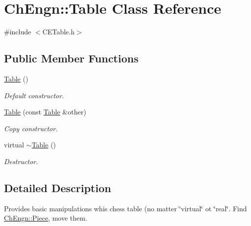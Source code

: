 \hypertarget{classChEngn_1_1Table}{
\section{ChEngn::Table Class Reference}
\label{classChEngn_1_1Table}
}


{\ttfamily \#include $<$CETable.h$>$}

\subsection*{Public Member Functions}
\begin{DoxyCompactItemize}
\item 
\hypertarget{classChEngn_1_1Table_acca1b7e7ea3e28fc5aa33e3efd71dcd1}{
\hyperlink{classChEngn_1_1Table_acca1b7e7ea3e28fc5aa33e3efd71dcd1}{Table} ()}
\label{classChEngn_1_1Table_acca1b7e7ea3e28fc5aa33e3efd71dcd1}

\begin{DoxyCompactList}\small\item\em Default constructor. \item\end{DoxyCompactList}\item 
\hyperlink{classChEngn_1_1Table_a9ccad112470efda3d3b6cfe55341bf01}{Table} (const \hyperlink{classChEngn_1_1Table}{Table} \&other)
\begin{DoxyCompactList}\small\item\em Copy constructor. \item\end{DoxyCompactList}\item 
\hypertarget{classChEngn_1_1Table_a11ecbf5aaa43cf800da3ccf1a8a20515}{
virtual \hyperlink{classChEngn_1_1Table_a11ecbf5aaa43cf800da3ccf1a8a20515}{$\sim$Table} ()}
\label{classChEngn_1_1Table_a11ecbf5aaa43cf800da3ccf1a8a20515}

\begin{DoxyCompactList}\small\item\em Destructor. \item\end{DoxyCompactList}\end{DoxyCompactItemize}


\subsection{Detailed Description}
Provides basic manipulations whis chess table (no matter \char`\"{}virtual\char`\"{} ot \char`\"{}real\char`\"{}. Find \hyperlink{classChEngn_1_1Piece}{ChEngn::Piece}, move them. 

